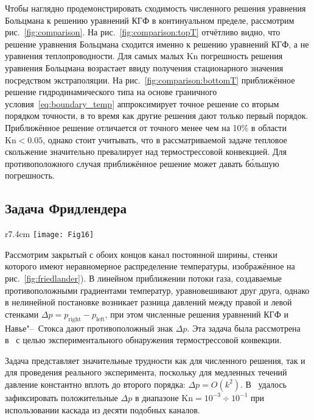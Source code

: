 \documentclass[
aps,%
12pt,%
final,%
notitlepage,%
oneside,%
onecolumn,%
nobibnotes,%
nofootinbib,%
superscriptaddress,%
noshowpacs,%
showkeys,%
centertags]%
{revtex4}
\newcommand{\Kn}{\mathrm{Kn}}
\newcommand{\OO}[1]{O\left(#1\right)}
\begin{document}
Чтобы наглядно продемонстрировать сходимость численного решения уравнения Больцмана к
решению уравнений КГФ в континуальном пределе, рассмотрим рис.~\ref{fig:comparison}.
На рис.~\ref{fig:comparison:topT} отчётливо видно, что решение уравнения Больцмана сходится
именно к решению уравнений КГФ, а не уравнения теплопроводности.
Для самых малых \(\Kn\) погрешность решения уравнения Больцмана возрастает
ввиду получения стационарного значения посредством экстраполяции.
На рис.~\ref{fig:comparison:bottomT} приближённое решение гидродинамического типа
на основе граничного условия~\eqref{eq:boundary_temp} аппроксимирует
точное решение со вторым порядком точности,
в то время как другие решения дают только первый порядок.
Приближённое решение отличается от точного менее чем на 10\% в области \(\Kn<0.05\),
однако стоит учитывать, что в рассматриваемой задаче тепловое скольжение значительно превалирует
над термострессовой конвекцией. Для противоположного случая приближённое решение может давать
б\'{о}льшую погрешность.

\subsection{Задача Фридлендера}

\begin{wrapfigure}{r}{7.4cm}
    \vspace{-10pt}
    \centering
    \texttt{[image: Fig16]}
    \vspace{-20pt}
    \caption{Геометрия задачи}\label{fig:friedlander}
    \vspace{20pt}
\end{wrapfigure}

Рассмотрим закрытый с обоих концов канал постоянной ширины,
стенки которого имеют неравномерное распределение температуры,
изображённое на рис.~\ref{fig:friedlander}).
В линейном приближении потоки газа, создаваемые противоположными градиентами температур,
уравновешивают друг друга, однако в нелинейной постановке возникает разница давлений
между правой и левой стенками \(\Delta{p}=p_\mathrm{right} - p_\mathrm{left}\),
при этом численные решения уравнений КГФ и Навье"--~Стокса дают противоположный знак \(\Delta{p}\).
Эта задача была рассмотрена в~\cite{Friedlander1997, Friedlander2003} с целью экспериментального
обнаружения термострессовой конвекции.

Задача представляет значительные трудности как для численного решения,
так и для проведения реального эксперимента, поскольку для медленных течений
давление константно вплоть до второго порядка: \(\Delta{p} = \OO{k^2}\).
В~\cite{Friedlander2003} удалось зафиксировать
положительные \(\Delta{p}\) в диапазоне \(\Kn = 10^{-3} \div 10^{-1}\)
при использовании каскада из десяти подобных каналов.
\end{document}
